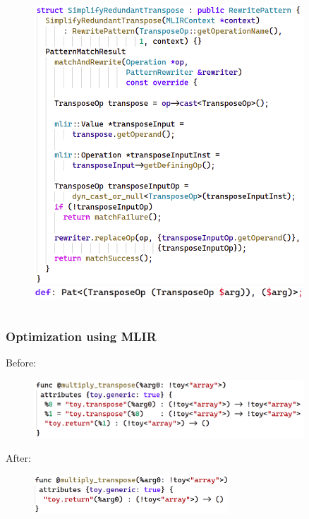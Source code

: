 \documentclass{beamer}
\begin{document}
\begin{frame}
\begin{columns}
\begin{column}{0.6\textwidth}
\begin{figure}[h]
        \includegraphics[width=0.9\textwidth]{pictures/PatternRewrite1.png}
        \vspace{0.1cm}
        \vspace{0.1cm}
        \includegraphics[width=0.9\textwidth]{pictures/TransposeTransposeOp2.png}
      \end{figure}
    \end{column}
  \end{columns}
\end{frame}

\begin{frame}
  \frametitle{Optimization using MLIR}
  Before:
  \begin{figure}[h]
    \raggedright
    \includegraphics[width=0.9\textwidth]{pictures/BeforeOpt.png}
  \end{figure}
  After:
  \begin{figure}[h]
    \raggedright
    \includegraphics[width=0.65\textwidth]{pictures/AfterOpt.png}
  \end{figure}
\end{frame}
\end{document}

